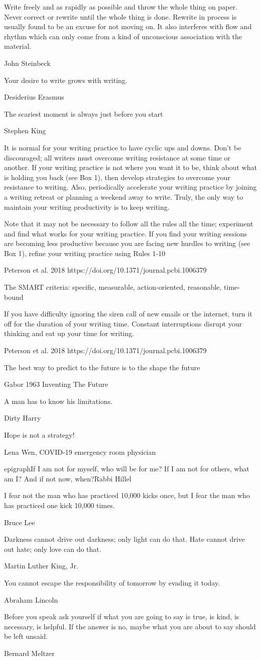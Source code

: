 \epigraph{Write freely and as rapidly as possible and throw the whole thing on paper. Never correct
or rewrite until the whole thing is done. Rewrite in process is usually found to be an
excuse for not moving on. It also interferes with flow and rhythm which can only come
from a kind of unconscious association with the material.}{John Steinbeck}
\epigraph{Your desire to write grows with writing.}{Desiderius Erasmus}
\epigraph{The scariest moment is always just before you start}{Stephen King}
\epigraph{It is normal for your writing practice to have cyclic ups and downs. Don't be discouraged; all writers must overcome writing resistance at some time or another. If your writing practice is not where you want it to be, think about what is holding you back (see Box 1), then develop strategies to overcome your resistance to writing. Also, periodically accelerate your writing practice by joining a writing retreat or planning a weekend away to write. Truly, the only way to maintain your writing productivity is to keep writing.}{}
\epigraph{Note that it may not be necessary to follow all the rules all the time; experiment and find what works for your writing practice. If you find your writing sessions are becoming less productive because you are facing new hurdles to writing (see Box 1), refine your writing practice using Rules 1-10}{Peterson et al. 2018 https://doi.org/10.1371/journal.pcbi.1006379}
\epigraph{The SMART criteria: specific, measurable, action-oriented, reasonable, time-bound}{}
\epigraph{If you have difficulty ignoring the siren call of new emails or the internet, turn it off for the duration of your writing time. Constant interruptions disrupt your thinking and eat up your time for writing.}{Peterson et al. 2018 https://doi.org/10.1371/journal.pcbi.1006379}
\epigraph{The best way to predict to the future is to the shape the future}{Gabor 1963 Inventing The Future}
\epigraph{A man has to know his limitations.}{Dirty Harry}
\epigraph{Hope is not a strategy!}{Lena Wen, COVID-19 emergency room physician}
epigraph{If I am not for myself, who will be for me? If I am not for others, what am I? And if not now, when?}{Rabbi Hillel}
\epigraph{I fear not the man who has practiced 10,000 kicks once, but I fear the man who has practiced one kick 10,000 times.}{Bruce Lee}
\epigraph{Darkness cannot drive out darkness; only light can do that. Hate cannot drive out hate; only love can do that.}{Martin Luther King, Jr.}
\epigraph{You cannot escape the responsibility of tomorrow by evading it today.}{Abraham Lincoln}
\epigraph{Before you speak ask yourself if what you are going to say is true, is kind, is necessary, is helpful. If the answer is no, maybe what you are about to say should be left unsaid.}{Bernard Meltzer}
